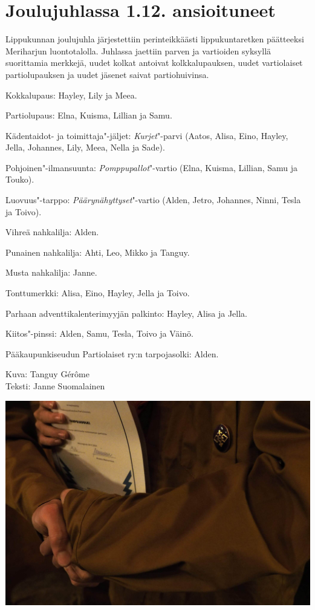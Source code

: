 \section{Joulujuhlassa 1.12. ansioituneet}

\begin{multicols}{2}
\noindent Lippukunnan joulujuhla järjestettiin perinteikkäästi 
lippukuntaretken päätteeksi Meriharjun luontotalolla. Juhlassa jaettiin 
parven ja vartioiden syksyllä suorittamia merkkejä, uudet kolkat antoivat 
kolkkalupauksen, uudet vartiolaiset partiolupauksen ja uudet jäsenet saivat 
partiohuivinsa.

Kokkalupaus: Hayley, Lily ja Meea.

Partiolupaus: Elna, Kuisma, Lillian ja Samu.

Kädentaidot- ja toimittaja"-jäljet: \textit{Kurjet}"-parvi (Aatos, Alisa, 
Eino, Hayley, Jella, Johannes, Lily, Meea, Nella ja Sade).

Pohjoinen"-ilmansuunta: \textit{Pomppupallot}"-vartio (Elna, Kuisma, 
Lillian, Samu ja Touko).
\columnbreak

Luovuus"-tarppo: \textit{Päärynähyttyset}"-vartio (Alden, Jetro, Johannes, 
Ninni, Tesla ja Toivo).

Vihreä nahkalilja: Alden.

Punainen nahkalilja: Ahti, Leo, Mikko ja Tanguy.

Musta nahkalilja: Janne.

Tonttumerkki: Alisa, Eino, Hayley, Jella ja Toivo.

Parhaan adventtikalenterimyyjän palkinto: Hayley, Alisa ja Jella. 

Kiitos"-pinssi: Alden, Samu, Tesla, Toivo ja Väinö.

Pääkaupunkiseudun Partiolaiset ry:n tarpojasolki: Alden.

\vspace*{.50cm}
{\raggedleft Kuva: Tanguy Gérôme\\
Teksti: Janne Suomalainen\par}

\vfill

\end{multicols}

\vspace*{.16cm}
\noindent\includegraphics[width=\linewidth,trim={0 0.9cm 0 0.7cm},clip]{assets/pikkujoulu1}


